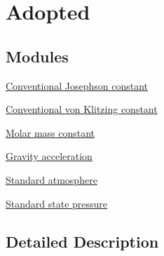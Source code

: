 \hypertarget{group___n_i_s_t_const-_adopted}{}\section{Adopted}
\label{group___n_i_s_t_const-_adopted}
\subsection*{Modules}
\begin{DoxyCompactItemize}
\item 
\hyperlink{group___n_i_s_t_const-_conventional_josephson_constant}{Conventional Josephson constant}
\item 
\hyperlink{group___n_i_s_t_const-_conventionalvon_klitzing_constant}{Conventional von Klitzing constant}
\item 
\hyperlink{group___n_i_s_t_const-_molar_mass_constant}{Molar mass constant}
\item 
\hyperlink{group___n_i_s_t_const-_gravity_acceleration}{Gravity acceleration}
\item 
\hyperlink{group___n_i_s_t_const-_standard_atmosphere}{Standard atmosphere}
\item 
\hyperlink{group___n_i_s_t_const-_standard_state_pressure}{Standard state pressure}
\end{DoxyCompactItemize}


\subsection{Detailed Description}
